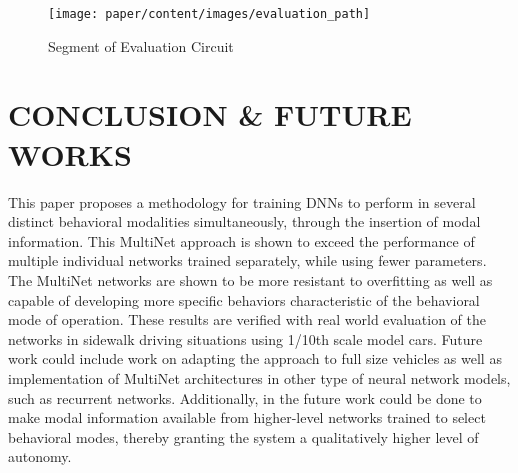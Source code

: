 \begin{figure}[t]
\centering
\texttt{[image: paper/content/images/evaluation\_path]}
\caption{Segment of Evaluation Circuit}
\label{fig:evalpath}
\end{figure}

\section{CONCLUSION \& FUTURE WORKS}
\label{sec:conclusion}
This paper proposes a methodology for training DNNs to perform in several distinct behavioral modalities simultaneously, through the insertion of modal information. This MultiNet approach is shown to exceed the performance of multiple individual networks trained separately, while using fewer parameters. The MultiNet networks are shown to be more resistant to overfitting as well as capable of developing more specific behaviors characteristic of the behavioral mode of operation. These results are verified with real world evaluation of the networks in sidewalk driving situations using 1/10th scale model cars. Future work could include work on adapting the approach to full size vehicles as well as implementation of MultiNet architectures in other type of neural network models, such as recurrent networks. Additionally, in the future work could be done to make modal information available from higher-level networks trained to select behavioral modes, thereby granting the system a qualitatively higher level of autonomy.
